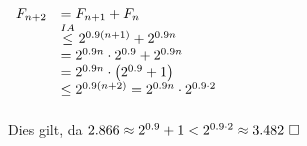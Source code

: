 \documentclass[a4paper,11pt,fleqn]{scrartcl}
\begin{document}
\begin{enumerate}
\begin{enumerate}
\begin{enumerate}
					\(
					\begin{array}{rl}
						F_{n+2} &= F_{n+1} + F_n \\
    				    &\overset{\tiny{IA}}{\leq} 2^{0.9(n + 1)} + 2^{0.9n} \\
    				    &= 2^{0.9n} \cdot 2^{0.9} + 2^{0.9n} \\
    				    &= 2^{0.9n} \cdot \big(2^{0.9} + 1\big) \\
    					&\leq 2^{0.9(n + 2)} = 2^{0.9n} \cdot 2^{0.9 \cdot 2} \\
					\end{array}
					\)\\ \\
					Dies gilt, da $2.866 \approx 2^{0.9} + 1 < 2^{0.9 \cdot 2}\approx 3.482 \qed$
			\end{enumerate}
		\end{enumerate}
		

\end{enumerate}
\end{document}

